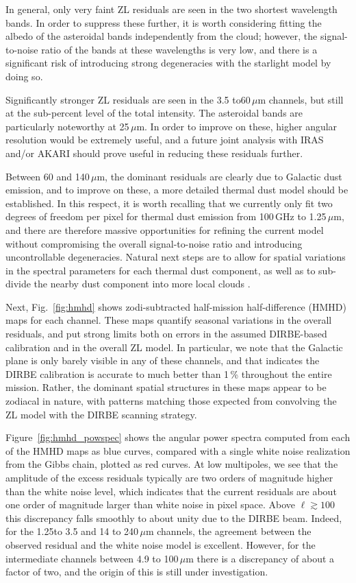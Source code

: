 \documentclass{aa}
\begin{document}
In general, only very faint ZL residuals are seen in the two
shortest wavelength bands. In order to suppress these further, it is
worth considering fitting the albedo of the asteroidal bands
independently from the cloud; however, the signal-to-noise ratio of
the bands at these wavelengths is very low, and there is a significant
risk of introducing strong degeneracies with the starlight model by
doing so.

Significantly stronger ZL residuals are seen in the 3.5 to60$\,\mu$m
channels, but still at the sub-percent level of the total
intensity. The asteroidal bands are particularly noteworthy at
25$\,\mu$m. In order to improve on these, higher angular resolution
would be extremely useful, and a future joint analysis with IRAS
and/or AKARI should prove useful in reducing these residuals further.

Between 60 and 140$\,\mu$m, the dominant residuals are clearly due to
Galactic dust emission, and to improve on these, a more detailed
thermal dust model should be established. In this respect, it is
worth recalling that we currently only fit two degrees of freedom per
pixel for thermal dust emission from 100\,GHz to 1.25$\,\mu$m, and
there are therefore massive opportunities for refining the current
model without compromising the overall signal-to-noise ratio and
introducing uncontrollable degeneracies. Natural next steps are to
allow for spatial variations in the spectral parameters for each
thermal dust component, as well as to sub-divide the nearby dust
component into more local clouds \citep{CG02_05}.

Next, Fig.~\ref{fig:hmhd} shows zodi-subtracted half-mission half-difference (HMHD)
maps for each channel. These maps quantify seasonal variations in the
overall residuals, and put strong limits both on errors in the assumed
DIRBE-based calibration and in the overall ZL model. In particular, we
note that the Galactic plane is only barely visible in any of these
channels, and that indicates the DIRBE calibration is accurate to much
better than 1\,\% throughout the entire mission. Rather, the dominant
spatial structures in these maps appear to be zodiacal in nature, with
patterns matching those expected from convolving the ZL model with the
DIRBE scanning strategy.

Figure~\ref{fig:hmhd_powspec} shows the angular power spectra computed
from each of the HMHD maps as blue curves, compared with a single
white noise realization from the Gibbs chain, plotted as red curves. At low multipoles, we
see that the amplitude of the excess residuals typically are two
orders of magnitude higher than the white noise level, which indicates
that the current residuals are about one order of magnitude larger
than white noise in pixel space. Above $\ell\gtrsim100$ this
discrepancy falls smoothly to about unity due to the DIRBE
beam. Indeed, for the 1.25to 3.5 and 14 to 240$\,\mu$m channels, the
agreement between the observed residual and the white noise model is
excellent. However, for the intermediate channels between
4.9 to 100$\,\mu$m  there is a discrepancy of about a factor of
two, and the origin of this is still under investigation.
\end{document}
